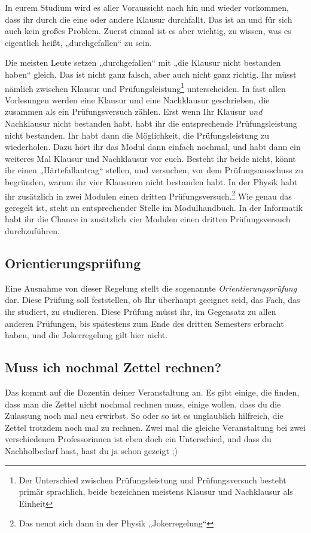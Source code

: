 
In eurem Studium wird es aller Voraussicht nach hin und wieder vorkommen, dass ihr durch die eine oder andere Klausur durchfallt. Das ist an und für sich auch kein großes Problem. Zuerst einmal ist es aber wichtig, zu wissen, was es eigentlich heißt, „durchgefallen“ zu sein.

Die meisten Leute setzen „durchgefallen“ mit „die Klausur nicht bestanden haben“ gleich. Das ist nicht ganz falsch, aber auch nicht ganz richtig. Ihr müsst nämlich zwischen Klausur und Prüfungsleistung\footnote{ Der Unterschied zwischen Prüfungsleistung und Prüfungsversuch besteht primär sprachlich, beide bezeichnen meistens Klausur und Nachklausur als Einheit} unterscheiden. In fast allen Vorlesungen werden eine Klausur und eine Nachklausur geschrieben, die zusammen als ein Prüfungsversuch zählen. Erst wenn Ihr Klausur \emph{und} Nachklausur nicht bestanden habt, habt ihr die entsprechende Prüfungsleistung nicht bestanden. Ihr habt dann die Möglichkeit, die Prüfungsleistung zu wiederholen. Dazu hört ihr das Modul dann einfach nochmal, und habt dann ein weiteres Mal Klausur und Nachklausur vor euch. Besteht ihr beide nicht, könnt ihr einen „Härtefallantrag“ stellen, und versuchen, vor dem Prüfungsausschuss zu begründen, warum ihr vier Klausuren nicht bestanden habt. In der Physik habt ihr zusätzlich in zwei Modulen einen dritten Prüfungsversuch.\footnote{Das nennt sich dann in der Physik „Jokerregelung“} Wie genau das geregelt ist, steht an entsprechender Stelle im Modulhandbuch. In der Informatik habt ihr die Chance in zusätzlich vier Modulen einen dritten Prüfungsversuch durchzuführen.

\subsection{Orientierungsprüfung}
Eine Ausnahme von dieser Regelung stellt die sogenannte \emph{Orientierungsprüfung} dar. Diese Prüfung soll feststellen, ob Ihr überhaupt geeignet seid, das Fach, das ihr studiert, zu studieren. Diese Prüfung müsst ihr, im Gegensatz zu allen anderen Prüfungen, bis spätestens zum Ende des dritten Semesters erbracht haben, und die Jokerregelung gilt hier nicht.

\subsection{Muss ich nochmal Zettel rechnen?}
Das kommt auf die Dozentin deiner Veranstaltung an. Es gibt einige, die finden, dass man die Zettel nicht nochmal rechnen muss, einige wollen, dass du die Zulassung noch mal neu erwirbst. So oder so ist es unglaublich hilfreich, die Zettel trotzdem noch mal zu rechnen. Zwei mal die gleiche Veranstaltung bei zwei verschiedenen Professorinnen ist eben doch ein Unterschied, und dass du Nachholbedarf hast, hast du ja schon gezeigt ;)
